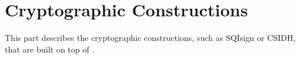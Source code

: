 \documentclass[../../main.tex]{subfiles}  %
\begin{document}
\chapter*{Cryptographic Constructions}
This part describes the cryptographic constructions, such as SQIsign or CSIDH, 
that are built on top of .
\end{document}
